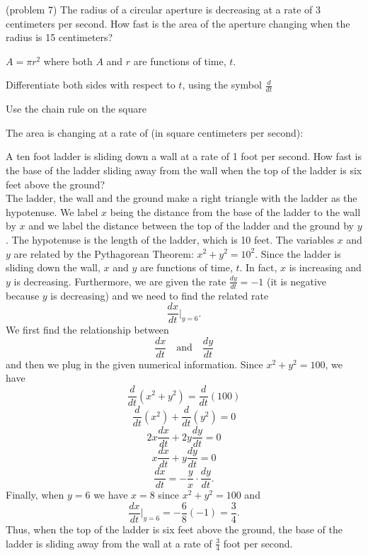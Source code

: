 \documentclass{ximera}
\begin{document}
\begin{problem}(problem 7)
The radius of a circular aperture is decreasing at a rate of 3 centimeters per second.  
How fast is the area of the aperture changing when the radius is 15 centimeters?

\begin{hint}
$A = \pi r^2$ where both $A$ and $r$ are functions of time, $t$.
\end{hint}

\begin{hint}
Differentiate both sides with respect to $t$, using the symbol $\frac{d}{dt}$
\end{hint}
\begin{hint}
Use the chain rule on the square
\end{hint}

The area is changing at a rate of (in square centimeters per second):
\begin{multipleChoice}
\choice{$90 \pi$}
\choice[correct]{$-90 \pi$}
\choice{$-120 \pi$}
\end{multipleChoice}
\end{problem}


\begin{example}[example 8]
A ten foot ladder is sliding down a wall at a rate of 1 foot per second.  How fast is the base of the 
ladder sliding away from the wall when the top of the ladder is six feet above the ground?\\
 The ladder, the wall and the ground make a right triangle with the ladder as the hypotenuse.  
We label $x$ being the distance from the base of the ladder 
to the wall by $x$ and we label  the distance between the top of the ladder and the ground by $y$. 
The hypotenuse is the length of the
ladder, which is 10 feet. The variables $x$ and $y$ are related by the 
Pythagorean Theorem: $x^2 + y^2 = 10^2$. Since the ladder is
sliding down the wall, $x$ and $y$ are functions of time, $t$. 
In fact, $x$ is increasing and $y$ is decreasing. Furthermore, we are given 
the rate $\frac{dy}{dt} = -1$ (it is negative because $y$ is decreasing)
and we need to find the related rate
\[\frac{dx}{dt}\bigg|_{y = 6}.\]
We first find the relationship between 
\[\frac{dx}{dt} \quad \text{and} \quad \frac{dy}{dt}\]
and then we plug in the given numerical information.
Since $x^2 + y^2 = 100$, we have
\[\frac{d}{dt} (x^2 + y^2 ) = \frac{d}{dt}(100)\]
\[\frac{d}{dt} (x^2) +\frac{d}{dt}(y^2 ) = 0\]
\[2x\frac{dx}{dt} + 2y\frac{dy}{dt} = 0\]
\[x\frac{dx}{dt} + y\frac{dy}{dt} = 0\]
\[\frac{dx}{dt} =- \frac{y}{x}\cdot \frac{dy}{dt}. \]
Finally, when $y= 6$ we have $x=8$ since $x^2 + y^2 = 100$ and
\[\frac{dx}{dt}\bigg|_{y = 6}= -\frac68 (-1) = \frac34.\]
Thus, when the top of the ladder is six feet above the ground, 
the base of the ladder is sliding away from the wall 
at a rate of $\frac34$ foot per second.

\begin{center}
\end{center}






\end{example}
\end{document}
